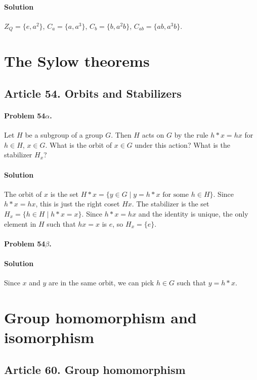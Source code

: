 \paragraph*{Solution}
$Z_Q = \{ e, a^2 \}$, $C_a = \{ a, a^3 \}$, $C_b = \{ b, a^2 b \}$,
$C_{ab} = \{ ab, a^3b \}$.


\section{The Sylow theorems}

\subsection{Article 54. Orbits and Stabilizers}
\paragraph{Problem 54$\alpha$.}
Let $H$ be a subgroup of a group $G$. Then $H$ acts on $G$ by the rule
$h * x = hx$ for $h \in H$, $x \in G$. What is the orbit of $x \in G$ under
this action? What is the stabilizer $H_x$?

\paragraph*{Solution}
The orbit of $x$ is the set $H * x = \{ y \in G \mid y = h * x \mbox{ for some }
h \in H \} $. Since $ h * x = hx$, this is just the right coset $Hx$. The
stabilizer is the set $ H_x = \{ h \in H \mid h*x = x \}$. Since $h*x=hx$ and
the identity is unique, the only element in $H$ such that $hx =x$ is $e$, so
$H_x = \{ e \}$.

\paragraph{Problem 54$\beta$.}

\paragraph*{Solution}
Since $x$ and $y$ are in the same orbit, we can pick $h \in G$ such that
$ y = h*x $.


\section{Group homomorphism and isomorphism}

\subsection{Article 60. Group homomorphism}

